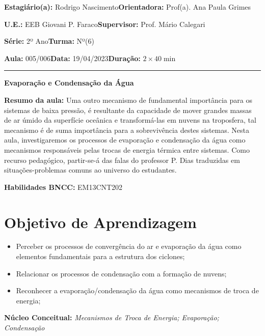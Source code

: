 \par\noindent\textbf{Estagiário(a):} Rodrigo Nascimento\hfill{}\textbf{Orientadora:} Prof(a). Ana Paula Grimes
\par\noindent\textbf{U.E.:} EEB Giovani P. Faraco\hfill{}\textbf{Supervisor:} Prof. Mário Calegari
\par\noindent\textbf{Série:} 2º Ano\hfill{}\textbf{Turma:} Nº(6)
\par\noindent\textbf{Aula:} 005/006\hfill{}\textbf{Data:} 19/04/2023\hfill{}\textbf{Duração:} $2\times 40\min$
\rule{\textwidth}{.5pt}
\bigskip{}  
\noindent
\begin{center}
	\textbf{Evaporação e Condensação da Água}
\end{center}
\par\noindent\textbf{Resumo da aula:} Uma outro mecanismo de fundamental importância para os sistemas de baixa pressão, é resultante da capacidade de mover grandes massas de ar úmido da superfície oceânica e transformá-las em nuvens na troposfera, tal mecanismo é de suma importância para a sobrevivência destes sistemas. Nesta aula, investigaremos os processos de evaporação e condensação da água como mecanismos responsáveis pelas trocas de energia térmica entre sistemas. Como recurso pedagógico, partir-se-á das falas do professor P. Dias traduzidas em situações-problemas  comuns ao universo do estudantes.
\par\noindent\textbf{Habilidades BNCC:} EM13CNT202

\section*{Objetivo de Aprendizagem}
\begin{itemize}
	\item Perceber os processos de convergência do ar e evaporação da água como elementos fundamentais para a estrutura dos ciclones;
	\item Relacionar os processos de condensação com a formação de nuvens;
	\item Reconhecer a evaporação/condensação da água como mecanismos de troca de energia;
\end{itemize}

\medskip{}

\noindent\textbf{Núcleo Conceitual:} \emph{Mecanismos de Troca de Energia; Evaporação; Condensação}
\newpage

